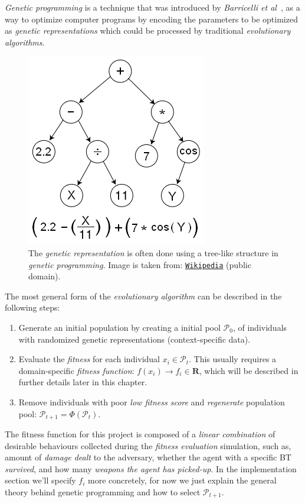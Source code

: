 \documentclass[a4paper, twocolumn]{article}
\begin{document}
	\emph{Genetic programming} is a technique that was introduced by \emph{Barricelli et al}~\cite{barricelli1954esempi}, as a way to optimize computer programs by encoding the parameters to be optimized as \emph{genetic representations} which could be processed by traditional \emph{evolutionary algorithms}.

	\begin{figure}[H]
        \centering
		\includegraphics[width=0.5\linewidth]{share/Genetic_Program_Tree.png}
        \caption{The \emph{genetic representation} is often done using a tree-like structure in \emph{genetic programming}. Image is taken from: \texttt{\href{https://upload.wikimedia.org/wikipedia/commons/7/77/Genetic\_Program\_Tree.png}{Wikipedia}} (public domain).}
		\label{fig:genetic_representation}
	\end{figure}

	The most general form of the \emph{evolutionary algorithm} can be described in the following steps:
    \begin{enumerate}
        \item Generate an initial population by creating a initial pool \(\mathcal{P}_0\), of individuals with randomized genetic representations (context-specific data).
        \item Evaluate the \emph{fitness} for each individual \(x_i \in \mathcal{P}_t\). This usually requires a domain-specific \emph{fitness function}: \(f(x_i)\rightarrow f_i \in \mathbf{R}\), which will be described in further details later in this chapter.
        \item Remove individuals with poor \textit{low fitness score} and \emph{regenerate} population pool: \(\mathcal{P}_{t+1} = \Phi(\mathcal{P}_t)\).
    \end{enumerate}

    The fitness function for this project is composed of a \emph{linear combination} of desirable behaviours collected during the \emph{fitness evaluation} simulation, such as, amount of \emph{damage dealt} to the adversary, whether the agent with a specific BT \emph{survived}, and how many \emph{weapons the agent has picked-up}. In the implementation section we'll specify \(f_i\) more concretely, for now we just explain the general theory behind genetic programming and how to select \(\mathcal{P}_{t+1}\).
\end{document}
